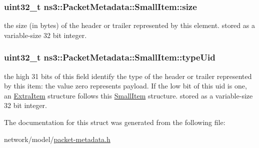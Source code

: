 \subsubsection[{\texorpdfstring{size}{size}}]{\setlength{\rightskip}{0pt plus 5cm}uint32\+\_\+t ns3\+::\+Packet\+Metadata\+::\+Small\+Item\+::size}\hypertarget{structns3_1_1PacketMetadata_1_1SmallItem_a9110e235a7387d19620985aa66ea7020}{}\label{structns3_1_1PacketMetadata_1_1SmallItem_a9110e235a7387d19620985aa66ea7020}
the size (in bytes) of the header or trailer represented by this element. stored as a variable-\/size 32 bit integer. 
\subsubsection[{\texorpdfstring{type\+Uid}{typeUid}}]{\setlength{\rightskip}{0pt plus 5cm}uint32\+\_\+t ns3\+::\+Packet\+Metadata\+::\+Small\+Item\+::type\+Uid}\hypertarget{structns3_1_1PacketMetadata_1_1SmallItem_a8eac5049e323f4651de81109d3037584}{}\label{structns3_1_1PacketMetadata_1_1SmallItem_a8eac5049e323f4651de81109d3037584}
the high 31 bits of this field identify the type of the header or trailer represented by this item\+: the value zero represents payload. If the low bit of this uid is one, an \hyperlink{structns3_1_1PacketMetadata_1_1ExtraItem}{Extra\+Item} structure follows this \hyperlink{structns3_1_1PacketMetadata_1_1SmallItem}{Small\+Item} structure. stored as a variable-\/size 32 bit integer. 

The documentation for this struct was generated from the following file\+:\begin{DoxyCompactItemize}
\item 
network/model/\hyperlink{packet-metadata_8h}{packet-\/metadata.\+h}\end{DoxyCompactItemize}
